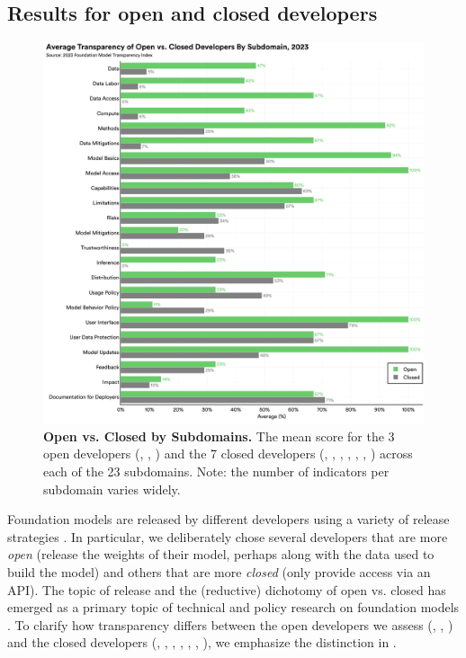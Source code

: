 \hypertarget{release-results}{\subsection{Results for open and closed developers}} \label{sec:release-results}
\begin{figure}
\centering
\includegraphics[keepaspectratio, height=\textheight, width=\textwidth]{figures/f13}
\caption{\textbf{Open vs. Closed by Subdomains.} 
The mean score for the 3 open developers (\meta, \huggingface, \stability) and the 7 closed developers (\openai, \anthropic, \google, \cohere, \aitwentyone, \inflection, \amazon) across each of the 23 subdomains. Note: the number of indicators per subdomain varies widely.
}
\label{fig:open-closed}
\end{figure}


Foundation models are released by different developers using a variety of release strategies \citep{liang2022community-norms, solaiman2023gradient}.
In particular, we deliberately chose several developers that are more \textit{open} (\eg release the weights of their model, perhaps along with the data used to build the model)  and others that are more \textit{closed} (\eg only provide access via an API).
The topic of release and the (reductive) dichotomy of open vs. closed has emerged as a primary topic of technical and policy research on foundation models \citep{solaiman2019release, sastry2021release, shevlane2022structured, liang2022community-norms, liang2022condemning, solaiman2023gradient, widder2023open, seger2023open}.
To clarify how transparency differs between the open developers we assess (\ie \meta, \huggingface, \stability) and the closed developers (\ie \openai, \google, \anthropic, \cohere, \aitwentyone, \inflection, \amazon), we emphasize the distinction in . 

